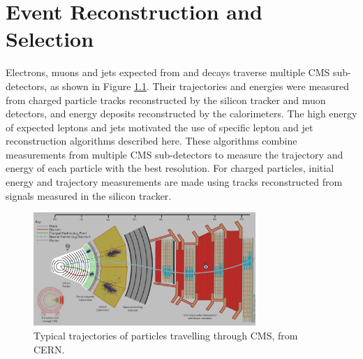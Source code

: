 \chapter{Event Reconstruction and Selection}
\label{sec:reco_chapter}

Electrons, muons and jets expected from \WR and \nul decays traverse multiple CMS sub-detectors, as shown in 
Figure \ref{fig:particleTrajectories}.  Their trajectories and energies were measured from charged particle tracks 
reconstructed by the silicon tracker and muon detectors, and energy deposits reconstructed by the calorimeters.  The 
high energy of expected leptons and jets motivated the use of specific lepton and jet reconstruction algorithms 
described here.  These algorithms combine measurements from multiple CMS sub-detectors to measure the trajectory 
and energy of each particle with the best resolution.  For charged particles, initial energy and trajectory 
measurements are made using tracks reconstructed from signals measured in the silicon tracker.

\begin{figure}[h]
	\centering
	\includegraphics[width=0.75\textwidth]{figures/flowOfParticlesThroughCMS.png}
	\caption{Typical trajectories of particles travelling through CMS, from CERN.}
	\label{fig:particleTrajectories}
\end{figure}



